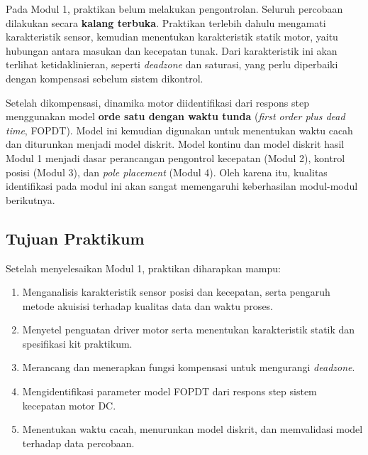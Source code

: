 \documentclass[11pt,a4paper]{article}
\begin{document}
Pada Modul 1, praktikan belum melakukan pengontrolan. Seluruh percobaan dilakukan secara \textbf{kalang terbuka}. Praktikan terlebih dahulu mengamati karakteristik sensor, kemudian menentukan karakteristik statik motor, yaitu hubungan antara masukan dan kecepatan tunak. Dari karakteristik ini akan terlihat ketidaklinieran, seperti \textit{deadzone} dan saturasi, yang perlu diperbaiki dengan kompensasi sebelum sistem dikontrol.

Setelah dikompensasi, dinamika motor diidentifikasi dari respons step menggunakan model \textbf{orde satu dengan waktu tunda} (\textit{first order plus dead time}, FOPDT). Model ini kemudian digunakan untuk menentukan waktu cacah dan diturunkan menjadi model diskrit. Model kontinu dan model diskrit hasil Modul 1 menjadi dasar perancangan pengontrol kecepatan (Modul 2), kontrol posisi (Modul 3), dan \textit{pole placement} (Modul 4). Oleh karena itu, kualitas identifikasi pada modul ini akan sangat memengaruhi keberhasilan modul-modul berikutnya.

\subsection{Tujuan Praktikum}
Setelah menyelesaikan Modul 1, praktikan diharapkan mampu:
\begin{enumerate}
	\item Menganalisis karakteristik sensor posisi dan kecepatan, serta pengaruh metode akuisisi terhadap kualitas data dan waktu proses.
	\item Menyetel penguatan driver motor serta menentukan karakteristik statik dan spesifikasi kit praktikum.
	\item Merancang dan menerapkan fungsi kompensasi untuk mengurangi \textit{deadzone}.
	\item Mengidentifikasi parameter model FOPDT dari respons step sistem kecepatan motor DC.
	\item Menentukan waktu cacah, menurunkan model diskrit, dan memvalidasi model terhadap data percobaan.
\end{enumerate}
\end{document}
